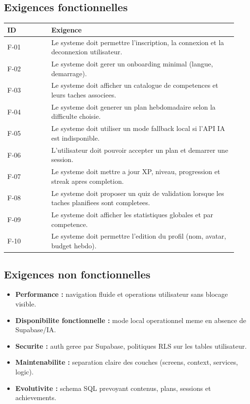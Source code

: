 \documentclass[12pt,a4paper]{article}
\begin{document}
\subsection{Exigences fonctionnelles}
\begin{longtable}{p{0.18\linewidth}p{0.76\linewidth}}
\toprule
\textbf{ID} & \textbf{Exigence} \\
\midrule
F-01 & Le systeme doit permettre l'inscription, la connexion et la deconnexion utilisateur. \\
F-02 & Le systeme doit gerer un onboarding minimal (langue, demarrage). \\
F-03 & Le systeme doit afficher un catalogue de competences et leurs taches associees. \\
F-04 & Le systeme doit generer un plan hebdomadaire selon la difficulte choisie. \\
F-05 & Le systeme doit utiliser un mode fallback local si l'API IA est indisponible. \\
F-06 & L'utilisateur doit pouvoir accepter un plan et demarrer une session. \\
F-07 & Le systeme doit mettre a jour XP, niveau, progression et streak apres completion. \\
F-08 & Le systeme doit proposer un quiz de validation lorsque les taches planifiees sont completees. \\
F-09 & Le systeme doit afficher les statistiques globales et par competence. \\
F-10 & Le systeme doit permettre l'edition du profil (nom, avatar, budget hebdo). \\
\bottomrule
\end{longtable}

\subsection{Exigences non fonctionnelles}
\begin{itemize}
  \item \textbf{Performance :} navigation fluide et operations utilisateur sans blocage visible.
  \item \textbf{Disponibilite fonctionnelle :} mode local operationnel meme en absence de Supabase/IA.
  \item \textbf{Securite :} auth geree par Supabase, politiques RLS sur les tables utilisateur.
  \item \textbf{Maintenabilite :} separation claire des couches (screens, context, services, logic).
  \item \textbf{Evolutivite :} schema SQL prevoyant contenus, plans, sessions et achievements.
\end{itemize}
\end{document}
